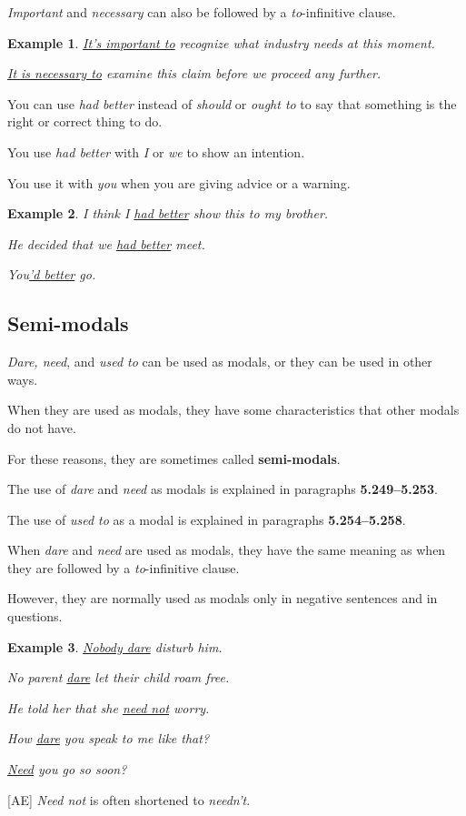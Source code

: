 \documentclass[oneside]{book}
\numberwithin{equation}{section}
\newtheorem{example}{Example}[section]
\begin{document}
\textit{Important} and \textit{necessary} can also be followed by a \textit{to}-infinitive clause.
\begin{example}
    \underline{It's important to} recognize what industry needs at this moment.
    
    \underline{It is necessary to} examine this claim before we proceed any further.
\end{example}
%
\noindent{} You can use \textit{had better} instead of \textit{should} or \textit{ought to} to say that something is the right or correct thing to do.

You use \textit{had better} with \textit{I} or \textit{we} to show an intention.

You use it with \textit{you} when you are giving advice or a warning.
\begin{example}
    I think I \underline{had better} show this to my brother.
    
    He decided that we \underline{had better} meet.
    
    You\underline{'d better} go.
\end{example}

\subsection{Semi-modals}
\noindent{} \textit{Dare, need}, and \textit{used to} can be used as modals, or they can be used in other ways.

When they are used as modals, they have some characteristics that other modals do not have.

For these reasons, they are sometimes called \textbf{semi-modals}.

%
The use of \textit{dare} and \textit{need} as modals is explained in paragraphs \textbf{5.249--5.253}.

%
The use of \textit{used to} as a modal is explained in paragraphs \textbf{5.254--5.258}.

%
\noindent{} When \textit{dare} and \textit{need} are used as modals, they have the same meaning as when they are followed by a \textit{to}-infinitive clause.

However, they are normally used as modals only in negative sentences and in questions.
\begin{example}
    \underline{Nobody dare} disturb him.
    
    No parent \underline{dare} let their child roam free.
    
    He told her that she \underline{need not} worry.
    
    How \underline{dare} you speak to me like that?
    
    \underline{Need} you go so soon?
\end{example}
%
[AE] \textit{Need not} is often shortened to \textit{needn't}.
\end{document}
